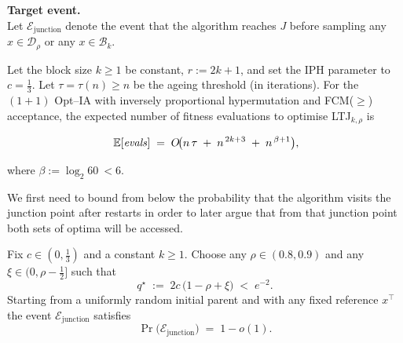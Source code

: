 \medskip\noindent
\textbf{Target event.}\\
Let $\mathcal{E}_{\mathrm{junction}}$ denote the event that the algorithm reaches $J$ before
sampling any $x\in\mathcal{D}_\rho$ or any $x\in\mathcal{B}_k$.



\begin{theorem}
	\label{thm:main-tau-final}
	Let the block size \(k\ge 1\) be constant, \(r:=2k+1\), and set the IPH
	parameter to \(c=\tfrac13\).
	Let \(\tau=\tau(n)\ge n\) be the ageing threshold (in iterations).  
	For the $(1{+}1)$ Opt–IA with inversely proportional hypermutation and
	FCM($\ge$) acceptance, the expected number of fitness evaluations to optimise
	\textsc{LTJ}\(_{k,\rho}\) is
	
	\[
	\;
	\mathbb{E}[\text{\emph{evals}}]
	\;=\;
	O\!\bigl(
	n\,\tau
	\;+\;
	n^{\,2k+3}
	\;+\;
	n^{\,\beta+1}
	\bigr),
	\]
	
	\noindent
	where $\beta:=\log_{2}60\ <6$.
	
	
\end{theorem}
We first need to bound from below the probability that the algorithm visits the junction point after restarts in order to later argue that from that junction point both sets of optima will be accessed.

\begin{lemma}
	\label{lem:junction-first-density-Bk}
	Fix $c\in(0,\tfrac13)$ and a constant $k\ge 1$.
	Choose any $\rho\in(0.8,0.9)$ and any $\xi\in(0,\rho-\tfrac12]$ such that
	\[
	q^\star \;:=\; 2c\,\bigl(1-\rho+\xi\bigr) \;<\; e^{-2}.
	\]
	Starting from a uniformly random initial parent and with any fixed reference $x^\top$ 
	the event $\mathcal{E}_{\mathrm{junction}}$ satisfies
	\[
	\Pr\bigl(\mathcal{E}_{\mathrm{junction}}\bigr)\;=\;1-o(1).
	\]
\end{lemma}

